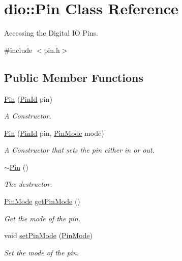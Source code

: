 \hypertarget{classdio_1_1Pin}{\section{dio\+:\+:Pin Class Reference}
\label{classdio_1_1Pin}
}


Accessing the Digital I\+O Pins.  




{\ttfamily \#include $<$pin.\+h$>$}

\subsection*{Public Member Functions}
\begin{DoxyCompactItemize}
\item 
\hyperlink{classdio_1_1Pin_af77414f31ece6e4dbe4f7fdb05d7c553}{Pin} (\hyperlink{namespacedio_aafaaf07a83434a2e2e27969628cd4606}{Pin\+Id} pin)
\begin{DoxyCompactList}\small\item\em A Constructor. \end{DoxyCompactList}\item 
\hyperlink{classdio_1_1Pin_a3cab5091af5b5a93983484538b775b41}{Pin} (\hyperlink{namespacedio_aafaaf07a83434a2e2e27969628cd4606}{Pin\+Id} pin, \hyperlink{namespacedio_a24514e0c3dce0933bd4a7389f4cf20c4}{Pin\+Mode} mode)
\begin{DoxyCompactList}\small\item\em A Constructor that sets the pin either in or out. \end{DoxyCompactList}\item 
\hyperlink{classdio_1_1Pin_a4543b53945de7851ccab236c85e534ed}{$\sim$\+Pin} ()
\begin{DoxyCompactList}\small\item\em The destructor. \end{DoxyCompactList}\item 
\hyperlink{namespacedio_a24514e0c3dce0933bd4a7389f4cf20c4}{Pin\+Mode} \hyperlink{classdio_1_1Pin_aa7617a8447ef09a180d24eaded6581f6}{get\+Pin\+Mode} ()
\begin{DoxyCompactList}\small\item\em Get the mode of the pin. \end{DoxyCompactList}\item 
void \hyperlink{classdio_1_1Pin_a099024e32df7e226b7a83e136c8b9c76}{set\+Pin\+Mode} (\hyperlink{namespacedio_a24514e0c3dce0933bd4a7389f4cf20c4}{Pin\+Mode})
\begin{DoxyCompactList}\small\item\em Set the mode of the pin. \end{DoxyCompactList}\item 

\end{DoxyCompactItemize}
